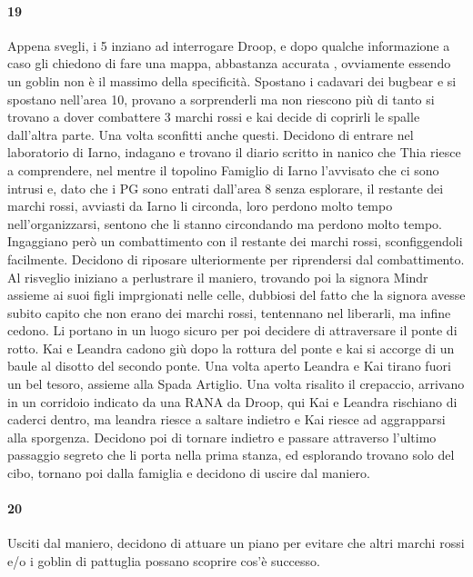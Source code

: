 \documentclass{article}
\begin{document}
                      \paragraph{19}
    Appena svegli, i 5 inziano ad interrogare Droop, e dopo qualche informazione a caso gli chiedono di fare una mappa, abbastanza accurata , ovviamente essendo un goblin non è il massimo della specificità. Spostano i cadavari dei bugbear e si spostano nell'area 10, provano a sorprenderli ma non riescono più di tanto si trovano a dover combattere 3 marchi rossi e kai decide di coprirli le spalle dall'altra parte. 
    Una volta sconfitti anche questi. Decidono di entrare nel laboratorio di Iarno, indagano e trovano il diario scritto in nanico che Thia riesce a comprendere, nel mentre il topolino Famiglio di Iarno l'avvisato che ci sono intrusi e, dato che i PG sono entrati dall'area 8 senza esplorare, il restante dei marchi rossi, avviasti da Iarno li circonda, loro perdono molto tempo nell'organizzarsi, sentono che li stanno circondando ma perdono molto tempo. Ingaggiano però un combattimento con il restante dei marchi rossi, sconfiggendoli facilmente.  Decidono di riposare ulteriormente per riprendersi dal combattimento. Al risveglio iniziano a perlustrare il maniero, trovando
    poi la signora Mindr assieme ai suoi figli imprgionati nelle celle, dubbiosi del fatto che la signora avesse subito capito che non erano dei marchi rossi, tentennano nel liberarli, ma infine cedono. Li portano in un luogo sicuro per poi decidere di attraversare il ponte di rotto. Kai e Leandra cadono giù dopo la rottura del ponte e kai si accorge di un baule al disotto del secondo ponte. Una volta aperto Leandra e Kai tirano fuori un bel tesoro, assieme alla Spada Artiglio. Una volta risalito il crepaccio, arrivano in un corridoio indicato da una RANA da Droop, qui Kai e Leandra rischiano di caderci dentro, ma leandra riesce a saltare indietro e Kai riesce ad aggrapparsi alla sporgenza. Decidono poi di tornare indietro e passare attraverso l'ultimo passaggio segreto che li porta nella prima stanza, ed esplorando trovano solo del cibo, tornano poi dalla famiglia e decidono di uscire dal maniero.
                      \paragraph{20}
    Usciti dal maniero, decidono di attuare un piano per evitare che altri marchi rossi e/o i goblin di pattuglia possano scoprire cos'è successo. 
      
    
\end{document}
